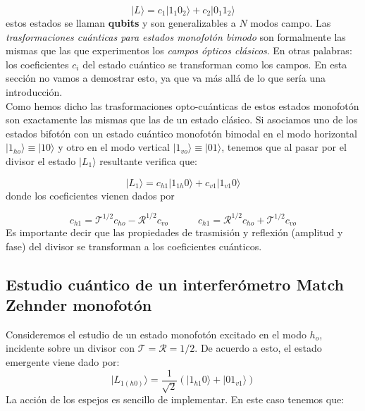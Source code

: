 \documentclass[12pt,a4paper]{book}
\numberwithin{equation}{section}
\numberwithin{figure}{section}
\newcommand{\tquad}{\quad \quad \quad}
\newcommand{\parentesis}[1]{\left( #1  \right)}
\newcommand{\1}{_{(1)}}
\newcommand{\2}{_{(2)}}
\theoremstyle{definition}
\begin{document}
\begin{equation}
|L\rangle = c_1 |1_1 0_2\rangle + c_2|0_1 1_2\rangle
\end{equation}
estos estados se llaman \textbf{qubits} y son generalizables a $N$ modos campo. Las \textit{trasformaciones cuánticas para estados monofotón bimodo} son formalmente las mismas que las que experimentos los \textit{campos ópticos clásicos}. En otras palabras: los coeficientes $c_i$ del estado cuántico se transforman como los campos. En esta sección no vamos a demostrar esto, ya que va más allá de lo que sería una introducción. \\

Como hemos dicho las trasformaciones opto-cuánticas de estos estados monofotón son exactamente las mismas que las de un estado clásico. Si asociamos uno de los estados bifotón con un estado cuántico monofotón bimodal en el modo horizontal $|1_{ho}\rangle \equiv |10\rangle$ y otro en el modo vertical $|1_{vo}\rangle \equiv |01\rangle$, tenemos que al pasar por el divisor el estado $|L_1 \rangle$ resultante verifica que:

\begin{equation}
|L_1\rangle = c_{h1} |1_{1h} 0\rangle + c_{v1} |1_{v1} 0 \rangle
\end{equation}
donde los coeficientes vienen dados por

\begin{equation}
c_{h1} = \mathcal{T}^{1/2} c_{ho} - \mathcal{R}^{1/2} c_{vo} \tquad
c_{h1} = \mathcal{R}^{1/2} c_{ho} + \mathcal{T}^{1/2} c_{vo}
\end{equation}
Es importante decir que las propiedades de trasmisión y reflexión (amplitud y fase) del divisor se transforman a los coeficientes cuánticos. 

\subsection{Estudio cuántico de un interferómetro Match Zehnder monofotón}

Consideremos el estudio de un estado monofotón excitado en el modo $h_o$, incidente sobre un divisor con $\mathcal{T}=\mathcal{R}=1/2$. De acuerdo a esto, el estado emergente viene dado por:
\begin{equation}
|L_{1(h0)} \rangle = \frac{1}{\sqrt{2}} \parentesis{|1_{h1}0\rangle + |01_{v1}\rangle}
\end{equation}
La acción de los espejos es sencillo de implementar. En este caso tenemos que:
\end{document}
